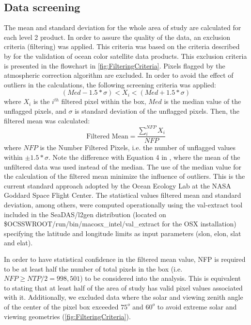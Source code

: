 \documentclass[onecolumn,3p,letterpaper,11pt]{elsarticle}
\begin{document}
\subsection{Data screening}
The mean and standard deviation for the whole area of study are calculated for each level 2 product. In order to assure the quality of the data, an exclusion criteria (filtering) was applied. This criteria was based on the criteria described by \citet{Bailey2006} for the validation of ocean color satellite data products. This exclusion criteria is presented in the flowchart in \autoref{fig:FilteringCriteria}. Pixels flagged by the atmospheric correction algorithm are excluded. In order to avoid the effect of outliers in the calculations, the following screening criteria was applied:
\begin{equation}\label{eq:filtered_value}
  (Med-1.5*\sigma) <  X_i < (Med+1.5*\sigma)
\end{equation}
where $X_i$ is the $i^{th}$ filtered pixel within the box, $Med$ is the median value of the unflagged pixels, and $\sigma$ is standard deviation of the unflagged pixels. Then, the filtered mean was calculated:
\begin{equation}\label{eq:filtered_mean}
  \text{Filtered Mean} =\frac{\displaystyle \sum_i^{NFP} X_i}{NFP}
\end{equation}
where $NFP$ is the Number Filtered Pixels, i.e. the number of unflagged values within $\pm 1.5*\sigma$. Note the difference with Equation 4 in \citet{Bailey2006}, where the mean of the unfiltered data was used instead of the median. The use of the median value for the calculation of the filtered mean minimize the influence of outliers. This is the current standard approach adopted by the Ocean Ecology Lab at the NASA Goddard Space Flight Center. The statistical values filtered mean and standard deviation, among others, were computed operationally using the val-extract tool included in the SeaDAS/l2gen distribution (located on {\ttfamily \$OCSSWROOT/run/bin/macosx\_intel/val\_extract}  for the OSX installation) specifying the latitude and longitude limits as input parameters (slon, elon, slat and elat).

In order to have statistical confidence in the filtered mean value, NFP is required to be at least half the number of total pixels in the box (i.e. $NFP\geq NTP/2 = 998,501$) to be considered into the analysis. This is equivalent to stating that at least half of the area of study has valid pixel values associated with it. Additionally, we excluded data where the solar and viewing zenith angle of the center of the pixel box exceeded $75^o$ and $60^o$ to avoid extreme solar and  viewing geometries \citep{Bailey2006} (\autoref{fig:FilteringCriteria}). 
\end{document}
